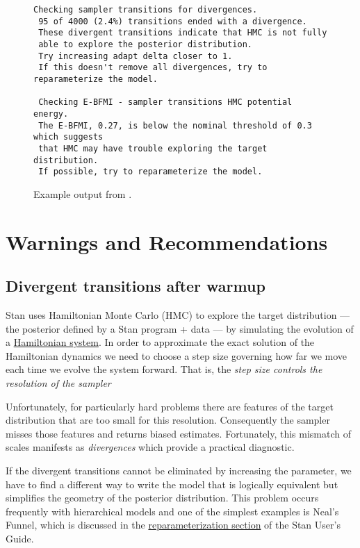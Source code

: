 \begin{figure}
\begin{Verbatim}[fontsize=\footnotesize]
 Checking sampler transitions for divergences.
 95 of 4000 (2.4%) transitions ended with a divergence.
 These divergent transitions indicate that HMC is not fully
 able to explore the posterior distribution.
 Try increasing adapt delta closer to 1.
 If this doesn't remove all divergences, try to reparameterize the model.

 Checking E-BFMI - sampler transitions HMC potential energy.
 The E-BFMI, 0.27, is below the nominal threshold of 0.3 which suggests
 that HMC may have trouble exploring the target distribution.
 If possible, try to reparameterize the model.
\end{Verbatim}
\caption{Example output from .}
\label{bin-diagnose-eg.figure}
\end{figure}


\section{Warnings and Recommendations}

\subsection{Divergent transitions after warmup}

Stan uses Hamiltonian Monte Carlo (HMC) to explore the target distribution ---
the posterior defined by a Stan program + data --- by simulating the evolution
of a \href{https://en.wikipedia.org/wiki/Hamiltonian_system}{Hamiltonian system}.
In order to approximate the exact solution of the Hamiltonian dynamics we need to
choose a step size governing how far we move each time we evolve the system
forward. That is, the {\it step size controls the resolution of the sampler}

Unfortunately, for particularly hard problems there are features of the target 
distribution that are too small for this resolution. Consequently the sampler 
misses those features and returns biased estimates. Fortunately, this mismatch 
of scales manifests as {\it divergences} which provide a practical diagnostic.

If the divergent transitions cannot be eliminated by increasing the 
parameter, we have to find a different way to write the model that is logically
equivalent but simplifies the geometry of the posterior distribution. This
problem occurs frequently with hierarchical models and one of the simplest
examples is Neal's Funnel, which is discussed in the
\href{https://mc-stan.org/docs/2_22/stan-users-guide/reparameterization-section.html}
{reparameterization section} of the Stan User's Guide.

